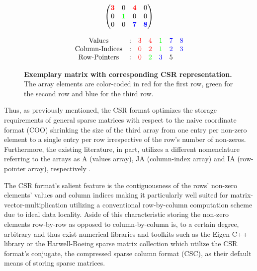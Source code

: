 \documentclass{article}
\begin{document}
    \begin{figure}[ht]
      \centering
      \begin{minipage}{0.4\textwidth}
        \centering
        $$
        \begin{pmatrix}
          \color{red}{\bm{3}} &                     0 &  \color{red}{\bm{4}} &                    0 \\
                            0 & \color{green}{\bm{1}} &                    0 &                    0 \\
                            0 &                     0 & \color{blue}{\bm{7}} & \color{blue}{\bm{8}} \\
        \end{pmatrix}
        $$
      \end{minipage}
      \begin{minipage}{0.4\textwidth}
        \centering
        $$
        \begin{matrix}
          \text{Values}  & : & \color{red}{3} &   \color{red}{4} & \color{green}{1} & \color{blue}{7} & \color{blue}{8} \\
          \text{Column-Indices} & : & \color{red}{0} &   \color{red}{2} & \color{green}{1} & \color{blue}{2} & \color{blue}{3} \\
          \text{Row-Pointers} & : & \color{red}{0} & \color{green}{2} &  \color{blue}{3} &               5 &                 \\
        \end{matrix}
        $$
      \end{minipage}
      \caption{\textbf{Exemplary matrix with corresponding CSR representation.} The array elements are color-coded in red for the first row, green for the second row and blue for the third row.}
      \label{fig:csr_example}
    \end{figure}

    Thus, as previously mentioned, the CSR format optimizes the storage requirements of general sparse matrices with respect to the naive coordinate format (COO) shrinking the size of the third array from one entry per non-zero element to a single entry per row irrespective of the row's number of non-zeros. Furthermore, the existing literature, in part, utilizes a different nomenclature referring to the arrays as A (values array), JA (column-index array) and IA (row-pointer array), respectively \cite{sparskit}.

    The CSR format's salient feature is the contiguousness of the rows' non-zero elements' values and column indices making it particularly well suited for matrix-vector-multiplication utilizing a conventional row-by-column computation scheme due to ideal data locality. Aside of this characteristic storing the non-zero elements row-by-row as opposed to column-by-column is, to a certain degree, arbitrary and thus exist numerical libraries and toolkits such as the Eigen C++ library \cite{eigen:website} or the Harwell-Boeing sparse matrix collection \cite{harwell-boeing} which utilize the CSR format's conjugate, the compressed sparse column format (CSC), as their default means of storing sparse matrices.
\end{document}

